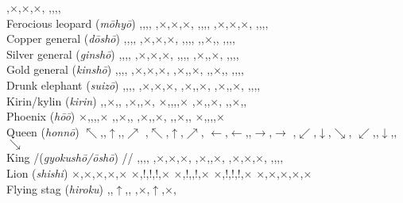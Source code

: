 \documentclass[10pt]{article}
\let\x=\times
\begin{document}
        {,$\x$,$\x$,$\x$,}%
        {,,,,}
\\
Ferocious leopard ({\it m\=ohy\=o}) \Hyo \Mohyo
    \movediagramfivexfive%
        {,,,,}%
        {,$\x$,$\x$,$\x$,}%
        {,,\Hyo,,}%
        {,$\x$,$\x$,$\x$,}%
        {,,,,}
\\
Copper general ({\it d\=osh\=o}) \Do \Dosho
    \movediagramfivexfive%
        {,,,,}%
        {,$\x$,$\x$,$\x$,}%
        {,,\Do,,}%
        {,,$\x$,,}%
        {,,,,}
\\
Silver general ({\it ginsh\=o}) \Gin \Ginsho
    \movediagramfivexfive%
        {,,,,}%
        {,$\x$,$\x$,$\x$,}%
        {,,\Kin,,}%
        {,$\x$,,$\x$,}%
        {,,,,}
\\
Gold general ({\it kinsh\=o}) \Kin \Kinsho
    \movediagramfivexfive%
        {,,,,}%
        {,$\x$,$\x$,$\x$,}%
        {,$\x$,\Gin,$\x$,}%
        {,,$\x$,,}%
        {,,,,}
\\
Drunk elephant ({\it suiz\=o}) \Zo \Suizo
    \movediagramfivexfive%
        {,,,,}%
        {,$\x$,$\x$,$\x$,}%
        {,$\x$,\Zo,$\x$,}%
        {,$\x$,,$\x$,}%
        {,,,,}
\\
Kirin/kylin ({\it kirin}) \Ki \Kirin
    \movediagramfivexfive%
        {,,$\x$,,}%
        {,$\x$,,$\x$,}%
        {$\x$,,\Ki,,$\x$}%
        {,$\x$,,$\x$,}%
        {,,$\x$,,}
\\
Phoenix ({\it h\=o\=o}) \Ho \Hoo
    \movediagramfivexfive%
        {$\x$,,,,$\x$}%
        {,,$\x$,,}%
        {,$\x$,\Ho,$\x$,}%
        {,,$\x$,,}%
        {$\x$,,,,$\x$}
\\
Queen ({\it honn\=o}) \Hon \Hono
    \movediagramfivexfive%
        {$\nwarrow$,,$\uparrow$,,$\nearrow$}%
        {,$\nwarrow$,$\uparrow$,$\nearrow$,}%
        {$\leftarrow$,$\leftarrow$,\Hon,$\rightarrow$,$\rightarrow$}%
        {,$\swarrow$,$\downarrow$,$\searrow$,}%
        {$\swarrow$,,$\downarrow$,,$\searrow$}
\\
King \Gyokusho/\Oosho ({\it gyokush\=o/\=osh\=o}) \Gyoku/\Oo \Gyokusho/\Oosho
    \movediagramfivexfive%
        {,,,,}%
        {,$\x$,$\x$,$\x$,}%
        {,$\x$,\Oo,$\x$,}%
        {,$\x$,$\x$,$\x$,}%
        {,,,,}
\\
Lion \Shishi ({\it shishi}) \Shi \Shishi
    \movediagramfivexfive%
        {$\x$,$\x$,$\x$,$\x$,$\x$}%
        {$\x$,!,!,!,$\x$}%
        {$\x$,!,\Shi,!,$\x$}%
        {$\x$,!,!,!,$\x$}%
        {$\x$,$\x$,$\x$,$\x$,$\x$}
\\
Flying stag \Hiroku ({\it hiroku})
    \movediagramfivexfive%
        {,,$\uparrow$,,}%
        {,$\x$,$\uparrow$,$\x$,}%
\end{document}
